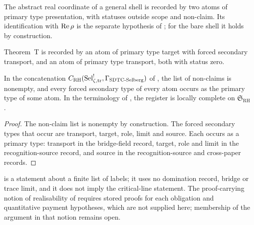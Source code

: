 \begin{classification}
\label{thm:rh:aor-real-coordinate-discharge}
The abstract real coordinate of a general shell is recorded by two
atoms of primary type presentation, with statuses outside scope and
non-claim.  Its identification with \(\operatorname{Re}\rho\) is the separate
hypothesis of ; for the bare shell it holds
by construction.
\end{classification}

\begin{classification}
\label{thm:rh:aor-translation-interface-discharge}
Theorem~T is recorded by an atom of primary type target with forced
secondary transport, and an atom of primary type transport, both with
status zero.
\end{classification}

\begin{theorem}
\label{thm:rh:aor-instance}
In the concatenation \(C_{\mathrm{RH}}(\mathrm{Sel}^{!}_{\zeta,\mathrm{tr}},\Gamma_{\mathrm{SDTC\text{-}Selberg}})\) of
,
the list of non-claims is nonempty, and every forced secondary type of
every atom occurs as the primary type of some atom.  In the terminology of \citet{TsiokosAOR2026}, the register
is locally complete on \(\mathfrak S_{\mathrm{RH}}\).
\end{theorem}

\begin{proof}
The non-claim list is nonempty by construction.  The
forced secondary types that occur are transport, target, role,
limit and source.  Each occurs as a primary type: transport in the bridge-field record,
target, role and limit in the recognition-source record, and source in
the recognition-source and cross-paper records.
\end{proof}

\begin{remark}
\label{rem:rh:aor-partial-status}
 is a statement about a finite list of
labels; it uses no domination record, bridge or trace limit, and it
does not imply the critical-line statement.  The proof-carrying notion
of realisability of \citet{TsiokosAOR2026} requires stored proofs for
each obligation and quantitative payment hypotheses, which are not
supplied here; membership of the argument in that notion remains open.
\end{remark}
